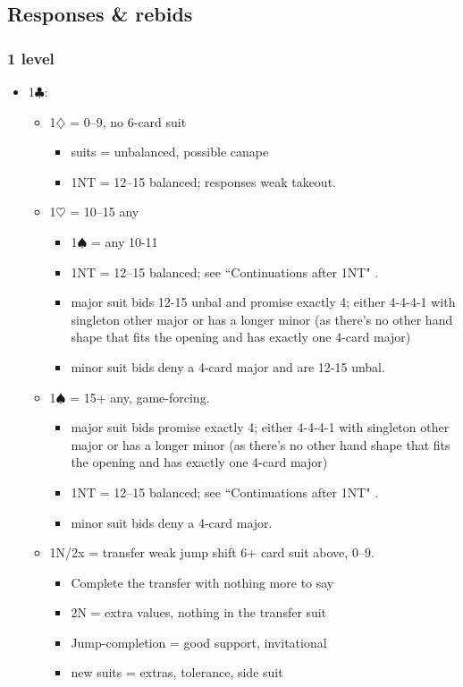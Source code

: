\documentclass[a4paper,14pt]{extarticle}
\begin{document}
\subsection{Responses \& rebids}
\label{sec:responses}

\subsubsection{1 level}
\label{sec:resp:1level}

\begin{itemize}
\item 1$\clubsuit$:
	\begin{itemize}
   \item 1$\diamondsuit$ = 0--9, no 6-card suit
		\begin{itemize}
      \item suits = unbalanced, possible canape
      \item 1NT = 12--15 balanced; responses weak takeout.
		\end{itemize}
   \item 1$\heartsuit$ = 10--15 any
		\begin{itemize}
      \item 1$\spadesuit$ = any 10-11
      \item 1NT = 12--15 balanced; see ``Continuations after 1NT" .
      \item major suit bids 12-15 unbal and promise exactly 4; either 4-4-4-1
            with singleton other major or has a longer minor (as there's no other
            hand shape that fits the opening and has exactly one 4-card major)
      \item minor suit bids deny a 4-card major and are 12-15 unbal.
		\end{itemize}
   \item 1$\spadesuit$ = 15+ any, game-forcing.
		\begin{itemize}
      \item major suit bids promise exactly 4; either 4-4-4-1 with singleton other
         major or has a longer minor (as there's no other hand shape that fits the
         opening and has exactly one 4-card major)
      \item 1NT = 12--15 balanced; see ``Continuations after 1NT" .
      \item minor suit bids deny a 4-card major.
		\end{itemize}
   \item 1N/2x = transfer weak jump shift 6+ card suit above, 0--9.
		\begin{itemize}
		\item Complete the transfer with nothing more to say
		\item 2N = extra values, nothing in the transfer suit
		\item Jump-completion = good support, invitational
		\item new suits = extras, tolerance, side suit
		\end{itemize}
	\end{itemize}


\end{itemize}
\end{document}
